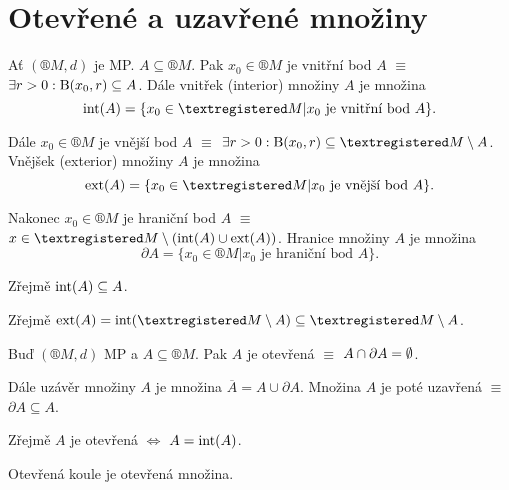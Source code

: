 \documentclass[12pt]{article}					%
\begin{document}
\section{Otevřené a uzavřené množiny}
    \begin{definice}
        Ať $(®M, d)$ je MP. $A \subseteq ®M$. Pak $x_0 \in ®M$ je vnitřní bod $A$ $≡$ $\exists r > 0: \operatorname{B}(x_0, r) \subseteq A$. Dále vnitřek (interior) množiny $A$ je množina
        $$ \Int(A) = \{x_0 \in ®M | x_0 \text{ je vnitřní bod } A\}. $$ 

        Dále $x_0 \in ®M$ je vnější bod $A$ $≡$ $\exists r>0: \B(x_0, r) \subseteq ®M \setminus A$. Vnějšek (exterior) množiny $A$ je množina
        $$ \Ext(A) = \{x_0 \in ®M | x_0 \text{ je vnější bod } A\}. $$

        Nakonec $x_0 \in ®M$ je hraniční bod $A$ $≡$ $x \in ®M \setminus (\Int(A) \cup \Ext(A))$. Hranice množiny $A$ je množina
        $$ \partial A = \{x_0 \in ®M | x_0 \text{ je hraniční bod } A\}. $$ 
    \end{definice}

    \begin{pozorovani}
        Zřejmě $\operatorname{int}(A) \subseteq A$.

        Zřejmě $\Ext(A) = \Int(®M \setminus A) \subseteq ®M \setminus A$.
    \end{pozorovani}

    \begin{definice}
        Buď $(®M, d)$ MP a $A \subseteq ®M$. Pak $A$ je otevřená $≡$ $A \cap \partial A = \emptyset$.

        Dále uzávěr množiny $A$ je množina $\overline{A} = A \cup \partial A$. Množina $A$ je poté uzavřená $≡$ $\partial A \subseteq A$.
    \end{definice}

    \begin{pozorovani}
        Zřejmě $A$ je otevřená $\Leftrightarrow$ $A = \operatorname{int}(A)$.

        Otevřená koule je otevřená množina.
    \end{pozorovani}
\end{document}
